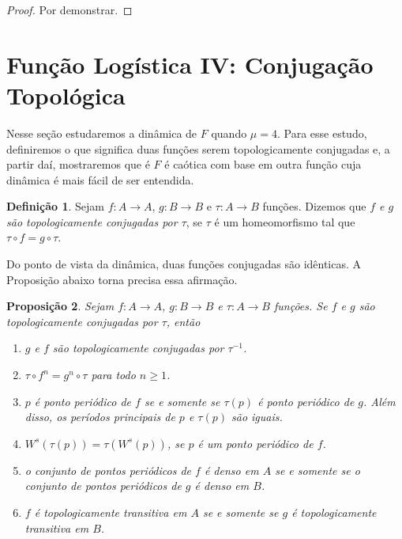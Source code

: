 \documentclass[a4paper, 12pt]{article}
\theoremstyle{definition}
\newtheorem{definition}{Definição}[section]
\theoremstyle{plain}
\newtheorem{proposition}[definition]{Proposição}
\theoremstyle{plain}
\theoremstyle{plain}
\theoremstyle{definition}
\theoremstyle{remark}
\begin{document}
\begin{proof}
Por demonstrar.
\end{proof}

\section{Função Logística IV: Conjugação Topológica}

Nesse seção estudaremos a dinâmica de $F$ quando $\mu = 4$. Para esse estudo, definiremos o que significa duas funções serem topologicamente conjugadas e, a partir daí, mostraremos que é $F$ é caótica com base em outra função cuja dinâmica é mais fácil de ser entendida.

\begin{definition}
Sejam $f: A \to A$, $g: B \to B$ e $\tau: A \to B$ funções. Dizemos que \textit{$f$ e $g$ são topologicamente conjugadas por $\tau$}, se $\tau$ é um homeomorfismo tal que $\tau \circ f = g \circ \tau$.
\end{definition}

Do ponto de vista da dinâmica, duas funções conjugadas são idênticas. A Proposição abaixo torna precisa essa afirmação.

\begin{proposition}
\label{proposition 5 1}
Sejam $f: A \to A$, $g: B \to B$ e $\tau: A \to B$ funções. Se $f$ e $g$ são topologicamente conjugadas por $\tau$, então
\begin{enumerate}
\item $g$ e $f$ são topologicamente conjugadas por $\tau^{-1}$.
\item $\tau \circ f^n = g^n \circ \tau$ para todo $n \geq 1$.
\item $p$ é ponto periódico de $f$ se e somente se $\tau(p)$ é ponto periódico de $g$. Além disso, os períodos principais de $p$ e $\tau(p)$ são iguais.
\item $W^s(\tau(p)) = \tau(W^s(p))$, se $p$ é um ponto periódico de $f$.
\item o conjunto de pontos periódicos de $f$ é denso em $A$ se e somente se o conjunto de pontos periódicos de $g$ é denso em $B$.
\item $f$ é topologicamente transitiva em $A$ se e somente se $g$ é topologicamente transitiva em $B$.
\end{enumerate}
\end{proposition}
\end{document}
